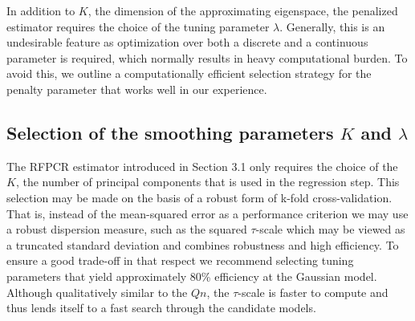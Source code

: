 \documentclass[11pt]{article}
\begin{document}
In addition to $K$, the dimension of the approximating eigenspace, the penalized estimator requires the choice of the tuning parameter $\lambda$. Generally, this is an undesirable feature as optimization over both a discrete and a continuous parameter is required, which normally results in heavy computational burden. To avoid this, we outline a computationally efficient selection strategy for the penalty parameter that works well in our experience.

\subsection{Selection of the smoothing parameters $K$ and $\lambda$}

The RFPCR estimator introduced in Section 3.1  only requires the choice of the $K$, the number of principal components that is used in the regression step. This selection may be made on the basis of a robust form of k-fold cross-validation. That is, instead of the mean-squared error as a performance criterion we may use a robust dispersion measure, such as the squared $\tau$-scale \citep{yohai1988high} which may be viewed as a truncated standard deviation and combines robustness and high efficiency.  To ensure a good trade-off in that respect we recommend selecting tuning parameters that yield approximately 80\% efficiency at the Gaussian model. Although qualitatively similar to the $Qn$, the $\tau$-scale is faster to compute and thus lends itself to a fast search through the	candidate models.
\end{document}
